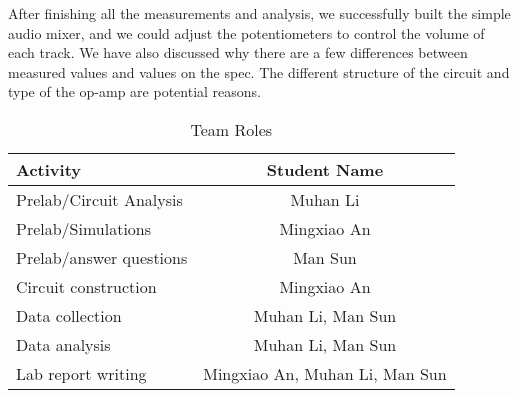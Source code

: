 \hfill \newline
\phantom{ } After finishing all the measurements and analysis, we successfully built the simple audio mixer, and we could adjust the potentiometers to control the volume of each track. We have also discussed why there are a few differences between measured values and values on the spec. The different structure of the circuit and type of the op-amp are potential reasons.\\

\begin{table}[!htbp]
	\caption{Team Roles}
	\renewcommand\arraystretch{1.5}\centering
	\begin{tabular}{l|c}
		\hline
		\hline
		Activity					&	Student Name 	\\
		\hline
		Prelab/Circuit Analysis		& 	Muhan Li		\\
		\hline
		Prelab/Simulations			&	Mingxiao An		\\
		\hline
		Prelab/answer questions		&	Man Sun			\\
		\hline
		Circuit construction		&	Mingxiao An		\\
		\hline
		Data collection				& Muhan Li, Man Sun	\\
		\hline
		Data analysis				& Muhan Li, Man Sun \\
		\hline
		Lab report writing			& Mingxiao An, Muhan Li, Man Sun \\
		\hline
		\hline
	\end{tabular}\\
\end{table}
